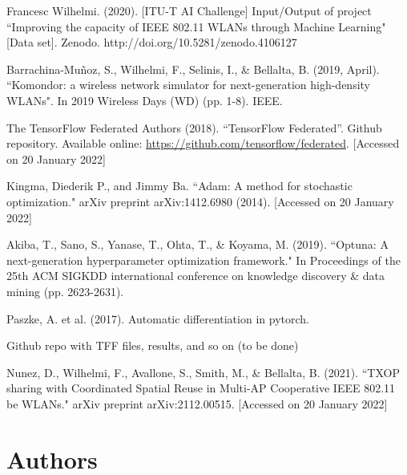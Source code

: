 \documentclass[10pt,a4paper,twocolumn]{article}
\newcommand{\ITUurl}[1]{\textcolor{blue}{\urlstyle{same}\url{#1}}}
\begin{document}
\begin{thebibliography}{9}
 Francesc Wilhelmi. (2020). [ITU-T AI Challenge] Input/Output of project ``Improving the capacity of IEEE 802.11 WLANs through Machine Learning" [Data set]. Zenodo. http://doi.org/10.5281/zenodo.4106127

 Barrachina-Muñoz, S., Wilhelmi, F., Selinis, I., \& Bellalta, B. (2019, April). ``Komondor: a wireless network simulator for next-generation high-density WLANs". In 2019 Wireless Days (WD) (pp. 1-8). IEEE.

 The TensorFlow Federated Authors (2018). ``TensorFlow Federated''. Github repository. Available online: \ITUurl{https://github.com/tensorflow/federated}. [Accessed on 20 January 2022] 

  Kingma, Diederik P., and Jimmy Ba. ``Adam: A method for stochastic optimization." arXiv preprint arXiv:1412.6980 (2014). [Accessed on 20 January 2022] 

  Akiba, T., Sano, S., Yanase, T., Ohta, T., \& Koyama, M. (2019). ``Optuna: A next-generation hyperparameter optimization framework." In Proceedings of the 25th ACM SIGKDD international conference on knowledge discovery \& data mining (pp. 2623-2631).

 Paszke, A. et al. (2017). Automatic differentiation in pytorch.

 Github repo with TFF files, results, and so on (to be done)

 Nunez, D., Wilhelmi, F., Avallone, S., Smith, M., \& Bellalta, B. (2021). ``TXOP sharing with Coordinated Spatial Reuse in Multi-AP Cooperative IEEE 802.11 be WLANs." arXiv preprint arXiv:2112.00515. [Accessed on 20 January 2022] 


\end{thebibliography}

\newpage
\section*{Authors}
\label{sec:auth}
\end{document}
